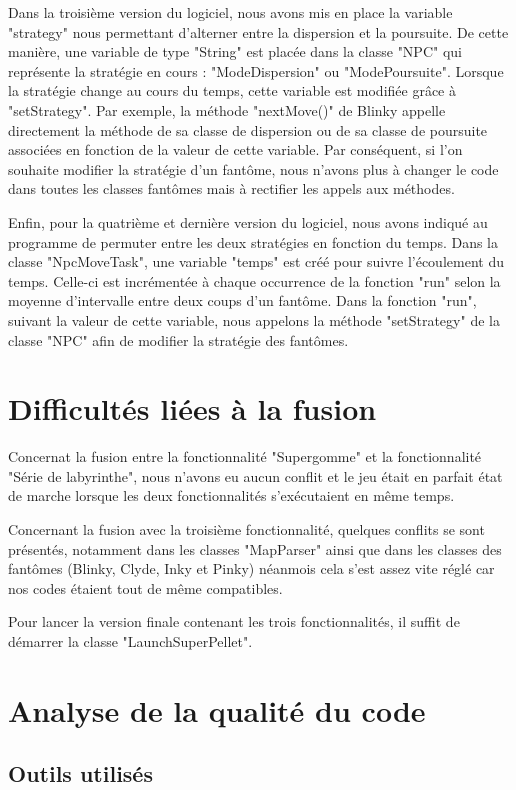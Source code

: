 \documentclass[a4paper,12pt]{report} %
\begin{document}
Dans la troisième version du logiciel, nous avons mis en place la variable "strategy" nous permettant d'alterner entre la dispersion et la poursuite.
De cette manière, une variable de type "String" est placée dans la classe "NPC" qui représente la stratégie en cours : "ModeDispersion" ou "ModePoursuite". Lorsque la stratégie change au cours du temps, cette variable est modifiée grâce à "setStrategy".
Par exemple, la méthode "nextMove()" de Blinky appelle directement la méthode de sa classe de dispersion ou de sa classe de poursuite associées en fonction de la valeur de cette variable.
Par conséquent, si l'on souhaite modifier la stratégie d'un fantôme, nous n'avons plus à changer le code dans toutes les classes fantômes mais à rectifier les appels aux méthodes.

Enfin, pour la quatrième et dernière version du logiciel, nous avons indiqué au programme de permuter entre les deux stratégies en fonction du temps.
Dans la classe "NpcMoveTask", une variable "temps" est créé pour suivre l'écoulement du temps. Celle-ci est incrémentée à chaque occurrence de la fonction "run" selon la moyenne d'intervalle entre deux coups d'un fantôme. 
Dans la fonction "run", suivant la valeur de cette variable, nous appelons la méthode "setStrategy" de la classe "NPC" afin de modifier la stratégie des fantômes.

\section{Difficultés liées à la fusion}
Concernat la fusion entre la fonctionnalité "Supergomme" et la fonctionnalité "Série de labyrinthe", nous n'avons eu aucun conflit et le jeu était en parfait état de marche lorsque les deux fonctionnalités s'exécutaient en même temps.

Concernant la fusion avec la troisième fonctionnalité, quelques conflits se sont présentés, notamment dans les classes "MapParser" ainsi que dans les classes des fantômes (Blinky, Clyde, Inky et Pinky) néanmois cela s'est assez vite réglé car nos codes étaient tout de même compatibles.

Pour lancer la version finale contenant les trois fonctionnalités, il suffit de démarrer la classe "LaunchSuperPellet".

\section{Analyse de la qualité du code}
\subsection{Outils utilisés}
\end{document}
